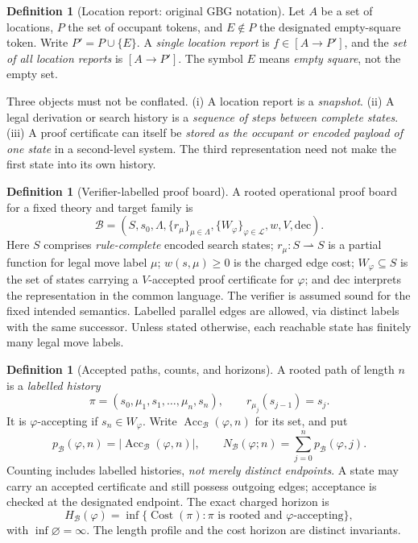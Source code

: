 \documentclass[11pt,letterpaper]{article}
\theoremstyle{definition}
\newtheorem{definition}[theorem]{Definition}
\newcommand{\Acc}{\operatorname{Acc}}
\newcommand{\Cost}{\operatorname{Cost}}
\newcommand{\B}{\mathcal B}
\begin{document}
\begin{definition}[Location report: original GBG notation]
Let $A$ be a set of locations, $P$ the set of occupant tokens, and $E\notin P$ the designated empty-square token. Write $P'=P\cup\{E\}$. A \emph{single location report} is $f\in[A\to P']$, and the \emph{set of all location reports} is $[A\to P']$. The symbol $E$ means \emph{empty square}, not the empty set.
\end{definition}

Three objects must not be conflated. (i) A location report is a \emph{snapshot}. (ii) A legal derivation or search history is a \emph{sequence of steps between complete states}. (iii) A proof certificate can itself be \emph{stored as the occupant or encoded payload of one state} in a second-level system. The third representation need not make the first state into its own history.

\begin{definition}[Verifier-labelled proof board]\label{def:board}
A rooted operational proof board for a fixed theory and target family is
\[
\B=(S,s_0,\Lambda,\{r_\mu\}_{\mu\in\Lambda},\{W_\varphi\}_{\varphi\in\mathcal L},w,V,\mathrm{dec}).
\]
Here $S$ comprises \emph{rule-complete} encoded search states; $r_\mu:S\rightharpoonup S$ is a partial function for legal move label $\mu$; $w(s,\mu)\ge0$ is the charged edge cost; $W_\varphi\subseteq S$ is the set of states carrying a $V$-accepted proof certificate for $\varphi$; and $\mathrm{dec}$ interprets the representation in the common language. The verifier is assumed sound for the fixed intended semantics. Labelled parallel edges are allowed, via distinct labels with the same successor. Unless stated otherwise, each reachable state has finitely many legal move labels.
\end{definition}

\begin{definition}[Accepted paths, counts, and horizons]\label{def:counts}
A rooted path of length $n$ is a \emph{labelled history}
\[
\pi=(s_0,\mu_1,s_1,\ldots,\mu_n,s_n),\qquad r_{\mu_j}(s_{j-1})=s_j.
\]
It is $\varphi$-accepting if $s_n\in W_\varphi$. Write $\Acc_{\B}(\varphi,n)$ for its set, and put
\[
p_{\B}(\varphi,n)=|\Acc_{\B}(\varphi,n)|,\qquad
N_{\B}(\varphi;n)=\sum_{j=0}^{n}p_{\B}(\varphi,j).
\]
Counting includes labelled histories, \emph{not merely distinct endpoints}. A state may carry an accepted certificate and still possess outgoing edges; acceptance is checked at the designated endpoint. The exact charged horizon is
\[
H_{\B}(\varphi)=\inf\{\Cost(\pi):\pi\text{ is rooted and }\varphi\text{-accepting}\},
\]
with $\inf\varnothing=\infty$. The length profile and the cost horizon are distinct invariants.
\end{definition}
\end{document}
